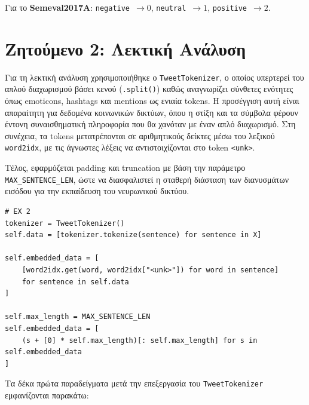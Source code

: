 \documentclass[12pt]{article}
\begin{document}
Για το \textbf{Semeval2017A}:
\texttt{negative}~$\to 0$, \texttt{neutral}~$\to 1$, \texttt{positive}~$\to 2$.

\section{Ζητούμενο 2: Λεκτική Ανάλυση}

Για τη λεκτική ανάλυση χρησιμοποιήθηκε ο \texttt{TweetTokenizer}, ο οποίος υπερτερεί του απλού διαχωρισμού βάσει κενού (\texttt{.split()}) καθώς αναγνωρίζει σύνθετες ενότητες όπως emoticons, hashtags και mentions ως ενιαία tokens. Η προσέγγιση αυτή είναι απαραίτητη για δεδομένα κοινωνικών δικτύων, όπου η στίξη και τα σύμβολα φέρουν έντονη συναισθηματική πληροφορία που θα χανόταν με έναν απλό διαχωρισμό. Στη συνέχεια, τα tokens μετατρέπονται σε αριθμητικούς δείκτες μέσω του λεξικού \texttt{word2idx}, με τις άγνωστες λέξεις να αντιστοιχίζονται στο token \texttt{<unk>}.

Τέλος, εφαρμόζεται padding και truncation με βάση την παράμετρο \texttt{MAX\_SENTENCE\_LEN}, ώστε να διασφαλιστεί η σταθερή διάσταση των διανυσμάτων εισόδου για την εκπαίδευση του νευρωνικού δικτύου.

\begin{lstlisting}
# EX 2
tokenizer = TweetTokenizer()
self.data = [tokenizer.tokenize(sentence) for sentence in X]

self.embedded_data = [
    [word2idx.get(word, word2idx["<unk>"]) for word in sentence]
    for sentence in self.data
]

self.max_length = MAX_SENTENCE_LEN
self.embedded_data = [
    (s + [0] * self.max_length)[: self.max_length] for s in self.embedded_data
]
\end{lstlisting}


Τα δέκα πρώτα παραδείγματα μετά την επεξεργασία του \texttt{TweetTokenizer} εμφανίζονται παρακάτω:
\end{document}
